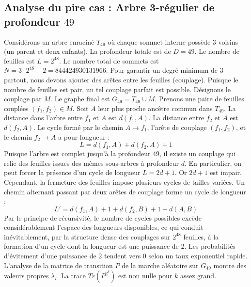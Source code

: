 \documentclass[11pt,a4paper]{article}
\begin{document}
\subsection{Analyse du pire cas : Arbre 3-régulier de profondeur $49$}
Considérons un arbre enraciné $T_{49}$ où chaque sommet interne possède 3 voisins (un parent et deux enfants).
La profondeur totale est de $D = 49$.
Le nombre de feuilles est $L = 2^{48}$.
Le nombre total de sommets est $N = 3 \cdot 2^{48} - 2 = 844424930131966$.
Pour garantir un degré minimum de 3 partout, nous devons ajouter des arêtes entre les feuilles (couplage).
Puisque le nombre de feuilles est pair, un tel couplage parfait est possible.
Désignons le couplage par $M$. Le graphe final est $G_{49} = T_{49} \cup M$.
Prenons une paire de feuilles couplées $(f_1, f_2) \in M$.
Soit $A$ leur plus proche ancêtre commun dans $T_{49}$.
La distance dans l'arbre entre $f_1$ et $A$ est $d(f_1, A)$.
La distance entre $f_2$ et $A$ est $d(f_2, A)$.
Le cycle formé par le chemin $A \to f_1$, l'arête de couplage $(f_1, f_2)$, et le chemin $f_2 \to A$ a pour longueur :
$$ L = d(f_1, A) + d(f_2, A) + 1 $$
Puisque l'arbre est complet jusqu'à la profondeur $49$, il existe un couplage qui relie des feuilles issues des mêmes sous-arbres à profondeur $d$.
En particulier, on peut forcer la présence d'un cycle de longueur $L = 2d + 1$. Or $2d+1$ est impair.
Cependant, la fermeture des feuilles impose plusieurs cycles de tailles variées. Un chemin alternant passant par deux arêtes de couplage forme un cycle de longueur :
$$ L' = d(f_1, A) + 1 + d(f_2, B) + 1 + d(A, B) $$
Par le principe de récursivité, le nombre de cycles possibles excède considérablement l'espace des longueurs disponibles, ce qui conduit inévitablement, par la structure dense des couplages sur $2^{48}$ feuilles, à la formation d'un cycle dont la longueur est une puissance de 2. Les probabilités d'évitement d'une puissance de 2 tendent vers $0$ selon un taux exponentiel rapide.
L'analyse de la matrice de transition $P$ de la marche aléatoire sur $G_{49}$ montre des valeurs propres $\lambda_i$. La trace $Tr(P^{2^k})$ est non nulle pour $k$ assez grand.
\end{document}
